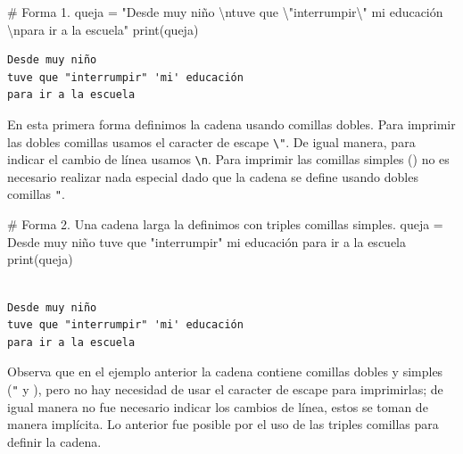 \documentclass[
  spanish,
  letterpaper,
]{scrbook}
\newenvironment{Shaded}{\begin{snugshade}}{\end{snugshade}}
\newcommand{\BuiltInTok}[1]{\textcolor[rgb]{0.00,0.23,0.31}{#1}}
\newcommand{\CharTok}[1]{\textcolor[rgb]{0.13,0.47,0.30}{#1}}
\newcommand{\CommentTok}[1]{\textcolor[rgb]{0.37,0.37,0.37}{#1}}
\newcommand{\NormalTok}[1]{\textcolor[rgb]{0.00,0.23,0.31}{#1}}
\newcommand{\OperatorTok}[1]{\textcolor[rgb]{0.37,0.37,0.37}{#1}}
\newcommand{\StringTok}[1]{\textcolor[rgb]{0.13,0.47,0.30}{#1}}
\theoremstyle{definition}
\theoremstyle{remark}
\begin{document}
\begin{Shaded}
\begin{Highlighting}[]
\CommentTok{\# Forma 1. }
\NormalTok{queja }\OperatorTok{=} \StringTok{"Desde muy niño }\CharTok{\textbackslash{}n}\StringTok{tuve que }\CharTok{\textbackslash{}"}\StringTok{interrumpir}\CharTok{\textbackslash{}"}\StringTok{ \textquotesingle{}mi\textquotesingle{} educación }\CharTok{\textbackslash{}n}\StringTok{para ir a la escuela"}
\BuiltInTok{print}\NormalTok{(queja)}
\end{Highlighting}
\end{Shaded}

\begin{verbatim}
Desde muy niño 
tuve que "interrumpir" 'mi' educación 
para ir a la escuela
\end{verbatim}

En esta primera forma definimos la cadena usando comillas dobles. Para
imprimir las dobles comillas usamos el caracter de escape
\texttt{\textbackslash{}"}. De igual manera, para indicar el cambio de
línea usamos \texttt{\textbackslash{}n}. Para imprimir las comillas
simples (\texttt{\textquotesingle{}}) no es necesario realizar nada
especial dado que la cadena se define usando dobles comillas \texttt{"}.

\begin{Shaded}
\begin{Highlighting}[]
\CommentTok{\#  Forma 2. Una cadena larga la definimos con triples comillas simples.}
\NormalTok{queja }\OperatorTok{=} \StringTok{\textquotesingle{}\textquotesingle{}\textquotesingle{}}
\StringTok{Desde muy niño}
\StringTok{tuve que "interrumpir" \textquotesingle{}mi\textquotesingle{} educación}
\StringTok{para ir a la escuela}
\StringTok{\textquotesingle{}\textquotesingle{}\textquotesingle{}}
\BuiltInTok{print}\NormalTok{(queja)}
\end{Highlighting}
\end{Shaded}

\begin{verbatim}

Desde muy niño
tuve que "interrumpir" 'mi' educación
para ir a la escuela
\end{verbatim}

Observa que en el ejemplo anterior la cadena contiene comillas dobles y
simples (\texttt{"} y \texttt{\textquotesingle{}}), pero no hay
necesidad de usar el caracter de escape para imprimirlas; de igual
manera no fue necesario indicar los cambios de línea, estos se toman de
manera implícita. Lo anterior fue posible por el uso de las triples
comillas para definir la cadena.
\end{document}
